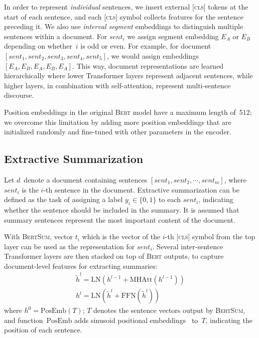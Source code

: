 \documentclass[11pt,a4paper]{article}
\begin{document}
    


    
    In order to represent \emph{individual} sentences, we insert
    external [\textsc{cls}] tokens at the start of each sentence, and
    each [\textsc{cls}] symbol collects features for the sentence
    preceding it. We also use \emph{interval segment} embeddings to
    distinguish multiple sentences within a document. For $sent_i$ we
    assign segment embedding $E_A$ or $E_B$ depending on whether~$i$
    is odd or even. For example, for document $[sent_1, sent_2,
    sent_3, sent_4, sent_5]$, we would assign embeddings $[E_A, E_B,
    E_A,E_B, E_A]$. This way, document representations are learned
    hierarchically where lower Transformer layers represent adjacent
    sentences, while higher layers, in combination with
    self-attention, represent multi-sentence discourse.
    
    
    
    Position embeddings in the original \textsc{Bert} model have a maximum
    length of~512; we overcome this limitation by adding more position
    embeddings that are initialized randomly and fine-tuned with other
    parameters in the encoder.
    
    
    
    
    
    \subsection{Extractive Summarization}
    \label{sec:extr-summ}
    
    Let $d$~denote a document containing sentences $[sent_1, sent_2,
    \cdots, sent_m]$, where $sent_i$ is the $i$-th sentence in the
    document.  Extractive summarization can be defined as the task of
    assigning a label $y_i \in \{0, 1\}$ to each $sent_i$, indicating
    whether the sentence should be included in the summary. It is assumed
    that summary sentences represent the most important content of the
    document.
    
    With \textsc{BertSum}, vector $t_i$ which is the vector of the $i$-th
    [\textsc{cls}] symbol from the top layer can be used as the
    representation for $sent_i$.  Several inter-sentence Transformer
    layers are then stacked on top of \textsc{Bert} outputs, to capture
    document-level features for extracting summaries:
    \begin{gather}
    \tilde{h}^l=\mathrm{LN}(h^{l-1}+\mathrm{MHAtt}(h^{l-1}))\\
    h^l=\mathrm{LN}(\tilde{h}^l+\mathrm{FFN}(\tilde{h}^l))
    \end{gather}
    where $h^0=\mathrm{PosEmb}(T)$; $T$ denotes the sentence vectors
    output by \textsc{BertSum}, and function~$\mathrm{PosEmb}$ adds
    sinusoid positional embeddings~\cite{vaswani2017attention} to~$T$,
    indicating the position of each sentence.
    
\end{document}
